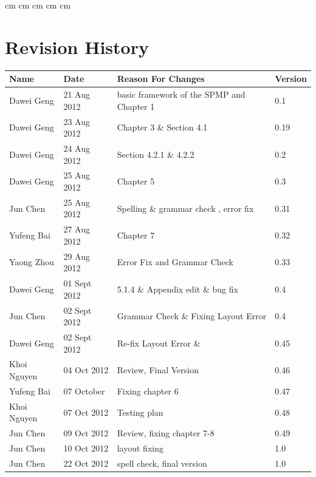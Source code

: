 \documentclass[11pt, a4paper]{report}
\begin{document}
 cm
 cm
 cm
 cm
 cm

\tableofcontents






\clearpage
\section*{Revision History}
\begin{tabular}{| l | l | l | l | }
\hline
Name      		&	Date        	&	Reason For Changes								&	Version			\\ \hline
Dawei Geng      &	21 Aug 2012    	&	basic framework of the SPMP and Chapter 1		&	0.1				\\ \hline
Dawei Geng      &	23 Aug 2012    	&	Chapter 3 \& Section 4.1						&	0.19			\\ \hline
Dawei Geng      &	24 Aug 2012     &	Section 4.2.1 \& 4.2.2							&	0.2				\\ \hline
Dawei Geng     	&	25 Aug 2012     &	Chapter 5										&	0.3				\\ \hline
Jun Chen		&	25 Aug 2012		&	Spelling \& grammar check , error fix			&	0.31			\\ \hline
Yufeng Bai      &	27 Aug 2012		&	Chapter 7										&	0.32			\\ \hline
Yaong Zhou		&	29 Aug 2012		&	Error Fix and Grammar Check						&	0.33			\\ \hline
Dawei Geng      &	01 Sept 2012     &	5.1.4 \& Appendix edit \& bug fix				&	0.4				\\ \hline
Jun Chen     	&	02 Sept 2012     &   Grammar Check \& Fixing Layout Error			&	0.4				\\ \hline
Dawei Geng     	&	02 Sept 2012     &	Re-fix Layout Error	\&  						&	0.45			\\ \hline
Khoi Nguyen		&	04 Oct 2012		&	Review, Final Version							&	0.46	\\ \hline
Yufeng Bai	&	07 October	&	Fixing chapter 6									&	0.47\\ \hline
Khoi Nguyen     &	07 Oct 2012    	&	Testing plan									&	0.48			\\ \hline
Jun Chen     		&	09 Oct 2012         	&Review, fixing chapter 7-8									&	0.49			\\ \hline
Jun Chen     		&	10 Oct 2012         	&layout fixing									&	1.0			\\ \hline
Jun Chen      		&	22 Oct 2012       	&	spell check, final version								&1.0			\\ \hline





\end{tabular}
\clearpage
\end{document}
